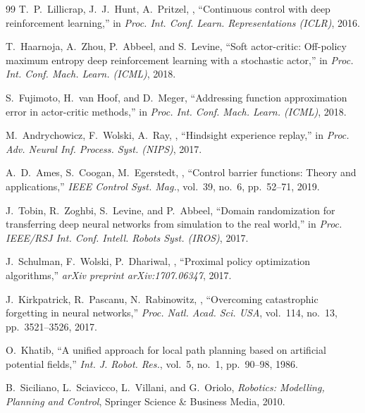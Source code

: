\documentclass[10pt,twocolumn,a4paper]{article}
\begin{document}
\begin{thebibliography}{99}
T.~P.~Lillicrap, J.~J.~Hunt, A.~Pritzel, \etal, ``Continuous control with deep reinforcement learning,'' in \textit{Proc. Int. Conf. Learn. Representations (ICLR)}, 2016.

T.~Haarnoja, A.~Zhou, P.~Abbeel, and S.~Levine, ``Soft actor-critic: Off-policy maximum entropy deep reinforcement learning with a stochastic actor,'' in \textit{Proc. Int. Conf. Mach. Learn. (ICML)}, 2018.

S.~Fujimoto, H.~van Hoof, and D.~Meger, ``Addressing function approximation error in actor-critic methods,'' in \textit{Proc. Int. Conf. Mach. Learn. (ICML)}, 2018.

M.~Andrychowicz, F.~Wolski, A.~Ray, \etal, ``Hindsight experience replay,'' in \textit{Proc. Adv. Neural Inf. Process. Syst. (NIPS)}, 2017.

A.~D.~Ames, S.~Coogan, M.~Egerstedt, \etal, ``Control barrier functions: Theory and applications,'' \textit{IEEE Control Syst. Mag.}, vol.~39, no.~6, pp.~52--71, 2019.

J.~Tobin, R.~Zoghbi, S.~Levine, and P.~Abbeel, ``Domain randomization for transferring deep neural networks from simulation to the real world,'' in \textit{Proc. IEEE/RSJ Int. Conf. Intell. Robots Syst. (IROS)}, 2017.

J.~Schulman, F.~Wolski, P.~Dhariwal, \etal, ``Proximal policy optimization algorithms,'' \textit{arXiv preprint arXiv:1707.06347}, 2017.

J.~Kirkpatrick, R.~Pascanu, N.~Rabinowitz, \etal, ``Overcoming catastrophic forgetting in neural networks,'' \textit{Proc. Natl. Acad. Sci. USA}, vol.~114, no.~13, pp.~3521--3526, 2017.

O.~Khatib, ``A unified approach for local path planning based on artificial potential fields,'' \textit{Int. J. Robot. Res.}, vol.~5, no.~1, pp.~90--98, 1986.

B.~Siciliano, L.~Sciavicco, L.~Villani, and G.~Oriolo, \textit{Robotics: Modelling, Planning and Control}, Springer Science \& Business Media, 2010.


\end{thebibliography}
\end{document}
